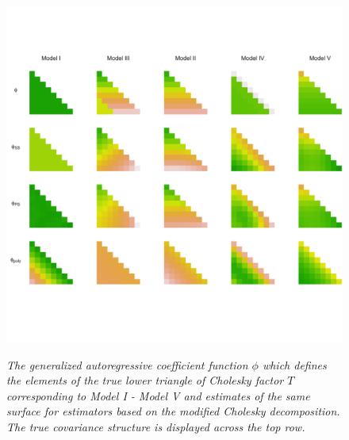 \begin{figure}[H] 
\centering
\caption{\textit{The generalized autoregressive coefficient function $\phi$ which defines the elements of the true lower triangle of Cholesky factor $T$ corresponding to Model I - Model V and estimates of the same surface for estimators based on the modified Cholesky decomposition. The true covariance structure is displayed across the top row.}}
  \includegraphics[width = 1\textwidth]{img/chapter-4/cholesky-estimate-lattice}
  \label{fig:chol-estimate-lattice}
\end{figure}

%

